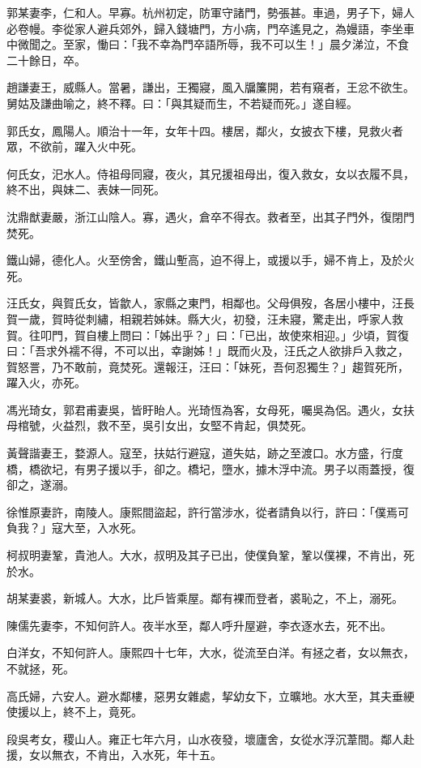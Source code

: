 \begin{pinyinscope}
郭某妻李，仁和人。早寡。杭州初定，防軍守諸門，勢張甚。車過，男子下，婦人必卷幔。李從家人避兵郊外，歸入錢塘門，方小病，門卒遙見之，為嫚語，李坐車中微聞之。至家，慟曰：「我不幸為門卒語所辱，我不可以生！」晨夕涕泣，不食二十餘日，卒。

趙謙妻王，威縣人。當暑，謙出，王獨寢，風入牖簾開，若有窺者，王忿不欲生。舅姑及謙曲喻之，終不釋。曰：「與其疑而生，不若疑而死。」遂自經。

郭氏女，鳳陽人。順治十一年，女年十四。樓居，鄰火，女披衣下樓，見救火者眾，不欲前，躍入火中死。

何氏女，汜水人。侍祖母同寢，夜火，其兄援祖母出，復入救女，女以衣履不具，終不出，與妹二、表妹一同死。

沈鼎猷妻嚴，浙江山陰人。寡，遇火，倉卒不得衣。救者至，出其子門外，復閉門焚死。

鐵山婦，德化人。火至傍舍，鐵山塹高，迫不得上，或援以手，婦不肯上，及於火死。

汪氏女，與賀氏女，皆歙人，家縣之東門，相鄰也。父母俱歿，各居小樓中，汪長賀一歲，賀時從刺繡，相親若姊妹。縣大火，初發，汪未寢，驚走出，呼家人救賀。往叩門，賀自樓上問曰：「姊出乎？」曰：「已出，故使來相迎。」少頃，賀復曰：「吾求外襦不得，不可以出，幸謝姊！」既而火及，汪氏之人欲排戶入救之，賀怒詈，乃不敢前，竟焚死。還報汪，汪曰：「妹死，吾何忍獨生？」趨賀死所，躍入火，亦死。

馮光琦女，郭君甫妻吳，皆盱眙人。光琦恆為客，女母死，囑吳為侶。遇火，女扶母棺號，火益烈，救不至，吳引女出，女堅不肯起，俱焚死。

黃聲諧妻王，婺源人。寇至，扶姑行避寇，道失姑，跡之至渡口。水方盛，行度橋，橋欲圮，有男子援以手，卻之。橋圮，墮水，據木浮中流。男子以雨蓋授，復卻之，遂溺。

徐惟原妻許，南陵人。康熙間盜起，許行當涉水，從者請負以行，許曰：「僕焉可負我？」寇大至，入水死。

柯叔明妻鞏，貴池人。大水，叔明及其子已出，使僕負鞏，鞏以僕裸，不肯出，死於水。

胡某妻裘，新城人。大水，比戶皆乘屋。鄰有裸而登者，裘恥之，不上，溺死。

陳儒先妻李，不知何許人。夜半水至，鄰人呼升屋避，李衣逐水去，死不出。

白洋女，不知何許人。康熙四十七年，大水，從流至白洋。有拯之者，女以無衣，不就拯，死。

高氏婦，六安人。避水鄰樓，惡男女雜處，挈幼女下，立曠地。水大至，其夫垂綆使援以上，終不上，竟死。

段吳考女，稷山人。雍正七年六月，山水夜發，壞廬舍，女從水浮沉葦間。鄰人赴援，女以無衣，不肯出，入水死，年十五。


\end{pinyinscope}
